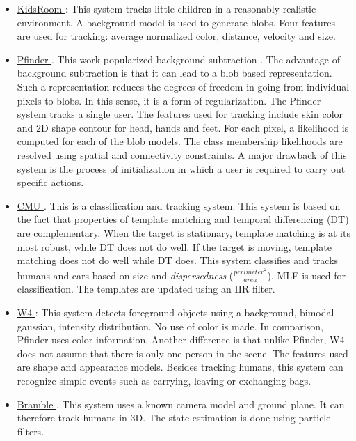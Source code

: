 \begin{Body}
\begin{itemize}
\item \underline{KidsRoom \cite{1997_CNF_ClosedWorldTracking_Intille}}:  This system tracks little children in a reasonably realistic environment.  A background model is used to generate blobs.  Four features are used for tracking: average normalized color, distance, velocity and size.  

\item \underline{Pfinder \cite{1997_JNL_Pfinder_Wren}}.  This work popularized background subtraction \cite{2006_JNL_SURVEYtrk_Yilmaz}.  The advantage of background subtraction is that it can lead to a blob based representation.  Such a representation reduces the degrees of freedom in going from individual pixels to blobs.  In this sense, it is a form of regularization.  The Pfinder system tracks a single user.  The features used for tracking include skin color and 2D shape contour for head, hands and feet.  For each pixel, a likelihood is computed for each of the blob models.  The class membership likelihoods are resolved using spatial and connectivity constraints.  A major drawback of this system is the process of initialization in which a user is required to carry out specific actions.

\item \underline{CMU \cite{1998_CNF_Tracking_Lipton}}.  This is a classification and tracking system.  This system is based on the fact that properties of template matching and temporal differencing (DT) are complementary.  When the target is stationary, template matching is at its most robust, while DT does not do well.  If the target is moving, template matching does not do well while DT does.  This system classifies and tracks humans and cars based on size and \emph{dispersedness} ($\frac{{perimeter}^2}{area}$).  MLE is used for classification.  The templates are updated using an IIR filter.

\item \underline{W4 \cite{2000_JNL_W4_Haritaoglu}}:  This system detects foreground objects using a background, bimodal-gaussian, intensity distribution.  No use of color is made.  In comparison, Pfinder uses color information.  Another difference is that unlike Pfinder, W4 does not assume that there is only one person in the scene.  The features used are shape and appearance models.  Besides tracking humans, this system can recognize simple events such as carrying, leaving or exchanging bags.

\item \underline{Bramble \cite{2001_CNF_TRKhuman_Isard}}.  This system uses a known camera model and ground plane.  It can therefore track humans in 3D.  The state estimation is done using particle filters.  


\end{itemize}
\end{Body}
